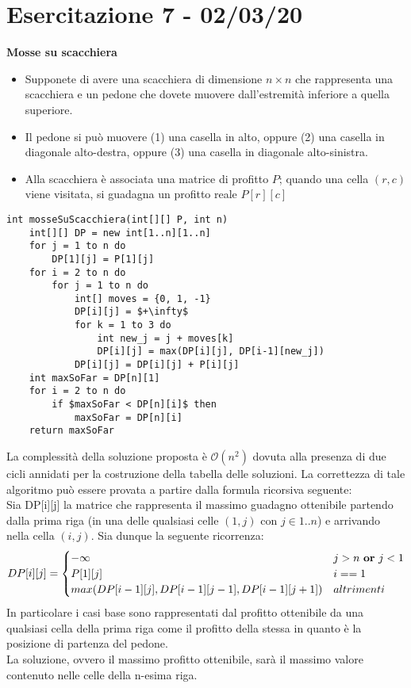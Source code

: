 \documentclass[../cheatSheetAlgoritmi.tex]{subfiles}
\begin{document}
\section{Esercitazione 7 - 02/03/20}
\textbf{Mosse su scacchiera}
\begin{itemize}
	\item Supponete di avere una scacchiera di dimensione $n \times n$ che rappresenta una scacchiera e un pedone che dovete muovere dall'estremità inferiore a quella superiore.
	\item Il pedone si può muovere (1) una casella in alto, oppure (2) una casella in diagonale alto-destra, oppure (3) una casella in diagonale alto-sinistra.
	\item Alla scacchiera è associata una matrice di profitto $P$; quando una cella $(r, c)$ viene visitata, si guadagna un profitto reale $P[r][c]$
\end{itemize}
\begin{lstlisting}[caption=Mosse su scacchiera]
int mosseSuScacchiera(int[][] P, int n)
    int[][] DP = new int[1..n][1..n]
    for j = 1 to n do
        DP[1][j] = P[1][j]
    for i = 2 to n do
        for j = 1 to n do
            int[] moves = {0, 1, -1}
            DP[i][j] = $+\infty$
            for k = 1 to 3 do
                int new_j = j + moves[k]
                DP[i][j] = max(DP[i][j], DP[i-1][new_j])
            DP[i][j] = DP[i][j] + P[i][j]
    int maxSoFar = DP[n][1]
    for i = 2 to n do
        if $maxSoFar < DP[n][i]$ then
            maxSoFar = DP[n][i]
    return maxSoFar
\end{lstlisting}
La complessità della soluzione proposta è $\mathcal{O}(n^2)$ dovuta alla presenza di due cicli annidati per la costruzione della tabella delle soluzioni. La correttezza di tale algoritmo può essere provata a partire dalla formula ricorsiva seguente: \\
Sia DP[i][j] la matrice che rappresenta il massimo guadagno ottenibile partendo dalla prima riga (in una delle qualsiasi celle $(1, j)$ con $j \in {1..n}$) e arrivando nella cella $(i, j)$. Sia dunque la seguente ricorrenza:
\begin{equation*}
  	DP[i][j] =\begin{cases}
        -\infty & \text{$j > n$ \textbf{or} $j < 1$} \\
    	P[1][j] & \text{$i == 1$}\\
    	max(DP[i-1][j], DP[i-1][j-1], DP[i-1][j+1]) & \text{$altrimenti$}
  	\end{cases}
\end{equation*}
In particolare i casi base sono rappresentati dal profitto ottenibile da una qualsiasi cella della prima riga come il profitto della stessa in quanto è la posizione di partenza del pedone.\\
La soluzione, ovvero il massimo profitto ottenibile, sarà il massimo valore contenuto nelle celle della n-esima riga.
\end{document}
